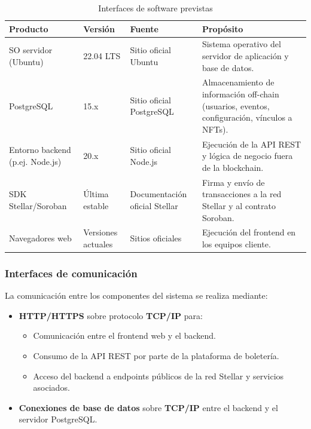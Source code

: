 \documentclass[12pt,letterpaper]{article}
\begin{document}
\begin{table}[h]
    \centering
    \begin{tabular}{p{3cm}p{2cm}p{4cm}p{5cm}}
        \toprule
        \textbf{Producto} & \textbf{Versión} & \textbf{Fuente} & \textbf{Propósito} \\
        \midrule
        SO servidor (Ubuntu) & 22.04 LTS & Sitio oficial Ubuntu & Sistema operativo del servidor de aplicación y base de datos. \\
        PostgreSQL & 15.x & Sitio oficial PostgreSQL & Almacenamiento de información off-chain (usuarios, eventos, configuración, vínculos a NFTs). \\
        Entorno backend (p.ej. Node.js) & 20.x & Sitio oficial Node.js & Ejecución de la API REST y lógica de negocio fuera de la blockchain. \\
        SDK Stellar/Soroban & Última estable & Documentación oficial Stellar & Firma y envío de transacciones a la red Stellar y al contrato Soroban. \\
        Navegadores web & Versiones actuales & Sitios oficiales & Ejecución del frontend en los equipos cliente. \\
        \bottomrule
    \end{tabular}
    \caption{Interfaces de software previstas}
    \label{tab:soft_interfaces}
\end{table}

\subsubsection{Interfaces de comunicación}

La comunicación entre los componentes del sistema se realiza mediante:

\begin{itemize}
    \item \textbf{HTTP/HTTPS} sobre protocolo \textbf{TCP/IP} para:
          \begin{itemize}
              \item Comunicación entre el frontend web y el backend.
              \item Consumo de la API REST por parte de la plataforma de
                    boletería.
              \item Acceso del backend a endpoints públicos de la red Stellar
                    y servicios asociados.
          \end{itemize}
    \item \textbf{Conexiones de base de datos} sobre \textbf{TCP/IP} entre el
          backend y el servidor PostgreSQL.
\end{itemize}
\end{document}

